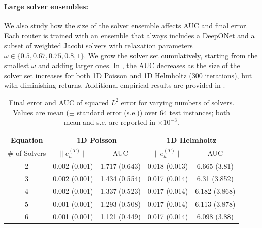 \documentclass{article} %
\newcommand\ambuj[1]{\textcolor{red}{AT: #1}}
\begin{document}
\paragraph{Large solver ensembles:} We also study how the size of the solver ensemble affects AUC and final error. Each router is trained with an ensemble that always includes a DeepONet and a subset of weighted Jacobi solvers with relaxation parameters $\omega \in \{0.5, 0.67, 0.75, 0.8, 1\}$. We grow the solver set cumulatively, starting from the smallest $\omega$ and adding larger ones. In , the AUC decreases as the size of the solver set increases for both 1D Poisson and 1D Helmholtz (300 iterations), but with diminishing returns. Additional empirical results are provided in .
\begin{table}[]
    \centering
    \begin{tabular}{|c|c|c|c|c|}
        \hline
         Equation & \multicolumn{2}{|c|}{1D Poisson} & \multicolumn{2}{|c|}{1D Helmholtz}\\
         \hline 
        \# of Solvers & $\|e^{(T)}_h\|$ & AUC & $\|e^{(T)}_h\|$ & AUC \\
         \hline
        2 & 0.002 (0.001) & 1.717 (0.643)  & 0.018 (0.013) & 6.665 (3.81)  \\
        3 & 0.002 (0.001) & 1.434 (0.554) & 0.017 (0.014) & 6.31 (3.852)\\
        4 & 0.002 (0.001) & 1.337 (0.523) & 0.017 (0.014) & 6.182 (3.868)  \\
        5 & 0.001 (0.001) & 1.293 (0.508) & 0.017 (0.014) & 6.113 (3.878) \\
        6 & 0.001 (0.001) & 1.121 (0.449) & 0.017 (0.014) & 6.098 (3.88) \\
         \hline
    \end{tabular}

    \caption{Final error and AUC of squared $L^2$ error for varying numbers of solvers. Values are mean ($\pm$ standard error (s.e.)) over 64 test instances; both mean and s.e. are reported in $\times 10^{-3}$.}
    \label{tab:errorcomparison2}
\end{table}



\end{document}
